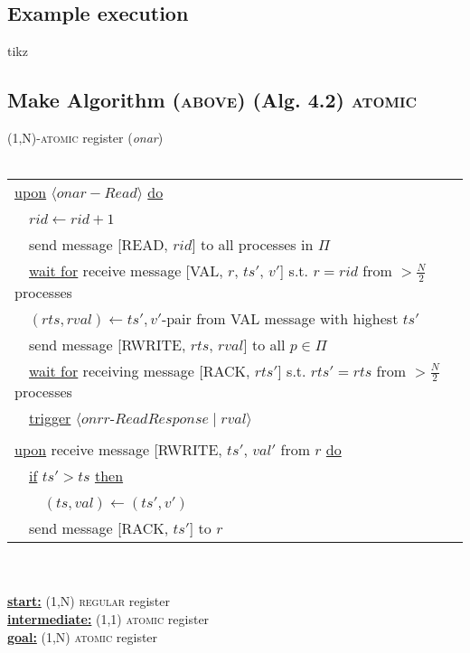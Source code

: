 \documentclass{article}
\begin{document}
\begin{adjustwidth}{2em}{2em}
		\subsection{Example execution}
		\begin{adjustwidth}{2em}{2em}
			tikz
		\end{adjustwidth}
		\newpage
		\subsection{Make Algorithm (\textsc{above}) (Alg. 4.2) \textsc{atomic}}
		\begin{adjustwidth}{2em}{2em}
			(1,N)-\textsc{atomic} register (\textit{onar}) \\
			\hfill \\
			\begin{tabular}{l}
				\underline{upon} $\langle onar-\textit{Read} \rangle$ \underline{do} \\
				\ \ $rid \leftarrow rid + 1$ \\
				\ \ send message [\textsc{READ}, $rid$] to all processes in $\Pi$ \\
				\ \ \underline{wait for} receive message [\textsc{VAL}, $r$, $ts'$, $v'$] s.t. $r = rid$ from $> \frac{N}{2}$ processes \\
				\ \ $(rts, rval) \leftarrow ts',v'$-pair from \textsc{VAL} message with highest $ts'$ \\
				\ \ send message [\textsc{RWRITE}, $rts$, $rval$] to all $p \in \Pi$ \\
				\ \ \underline{wait for} receiving message [\textsc{RACK}, $rts'$] s.t. $rts' = rts$ from $> \frac{N}{2}$ processes \\
				\ \ \underline{trigger} $\langle \textit{onrr-ReadResponse} \mid rval \rangle$ \\
				\\
				\underline{upon} receive message [\textsc{RWRITE}, $ts'$, $val'$ from $r$ \underline{do} \\
				\ \ \underline{if} $ts' > ts$ \underline{then} \\
				\ \ \ \ $(ts, val) \leftarrow (ts',v')$ \\
				\ \ send message [\textsc{RACK}, $ts'$] to $r$ \\
			\end{tabular}
			\hfill \\ \\
			\underline{\textbf{start:}} (1,N) \textsc{regular} register \\
			\underline{\textbf{intermediate:}} (1,1) \textsc{atomic} register \\
			\underline{\textbf{goal:}} (1,N) \textsc{atomic} register \\
		\end{adjustwidth}

\end{adjustwidth}
\end{document}
